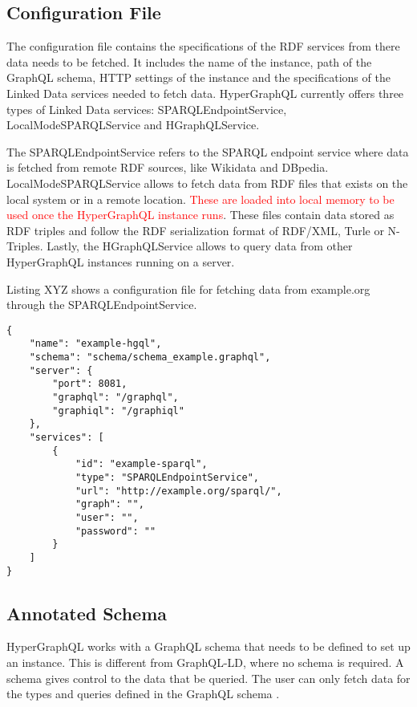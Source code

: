 \subsection{Configuration File}

The configuration file contains the specifications of the RDF services from there data needs to be fetched. It includes the name of the instance, path of the GraphQL schema, HTTP settings of the instance and the specifications of the Linked Data services needed to fetch data. HyperGraphQL currently offers three types of Linked Data services: SPARQLEndpointService, LocalModeSPARQLService and HGraphQLService. 

The SPARQLEndpointService refers to the SPARQL endpoint service where data is fetched from remote RDF sources, like Wikidata and DBpedia. LocalModeSPARQLService allows to fetch data from RDF files that exists on the local system or in a remote location. \textcolor{red}{These are loaded into local memory to be used once the HyperGraphQL instance runs}. These files contain data stored as RDF triples and follow the RDF serialization format of RDF/XML, Turle or N-Triples. Lastly, the HGraphQLService allows to query data from other HyperGraphQL instances running on a server.

Listing XYZ shows a configuration file for fetching data from example.org through the SPARQLEndpointService.

\begin{minipage}{\linewidth}
\begin{lstlisting}[label=listing:listing13, caption={An example configuration file}]
{
    "name": "example-hgql",
    "schema": "schema/schema_example.graphql",
    "server": {
        "port": 8081,
        "graphql": "/graphql",
        "graphiql": "/graphiql"
    },
    "services": [
        {
            "id": "example-sparql",
            "type": "SPARQLEndpointService",
            "url": "http://example.org/sparql/",
            "graph": "",
            "user": "",
            "password": ""
        }
    ]
}
\end{lstlisting}
\end{minipage}

\subsection{Annotated Schema}

HyperGraphQL works with a GraphQL schema that needs to be defined to set up an instance. This is different from GraphQL-LD, where no schema is required. A schema gives control to the data that be queried. The user can only fetch data for the types and queries defined in the GraphQL schema \cite{Gleim2020}.

